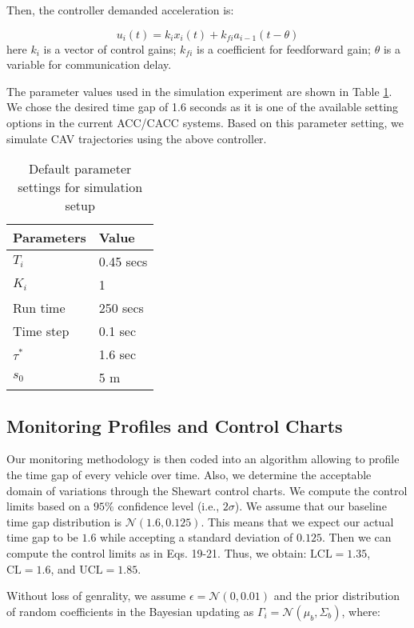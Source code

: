 \documentclass{article}
\begin{document}
Then, the controller demanded acceleration is:

\begin{equation}
u_i(t) = k_ix_i(t) + k_{fi}a_{i-1}(t-\theta)
\end{equation}
here $k_i$ is a vector of control gains; $k_{fi}$ is a coefficient for feedforward gain; $\theta$ is a variable for communication delay. 

The parameter values used in the simulation experiment are shown in Table \ref{tab:setup}. We chose the desired time gap of 1.6 seconds as it is one of the available setting options in the current ACC/CACC systems. Based on this parameter setting, we simulate CAV trajectories using the above controller.  

\begin{table}[!ht]
\centering
\caption{Default parameter settings for simulation setup}
    \begin{tabular}{ll}
    \hline
    \textbf{Parameters} & \textbf{Value}\\
    \hline
        $T_i$ & 0.45 secs\\
        $K_i$ & 1 \\ 
        Run time & 250 secs \\
        Time step & 0.1 sec\\
        $\tau^*$ & 1.6 sec \\
        $s_0$ & 5 m\\
    \hline
\end{tabular}
\label{tab:setup}
\end{table}

\subsection{Monitoring Profiles and Control Charts}

Our monitoring methodology is then coded into an algorithm allowing to profile the time gap of every vehicle over time. Also, we determine the acceptable domain of variations through the Shewart control charts. We compute the control limits based on a $95\%$ confidence level (i.e., $2 \sigma $). We assume that our baseline time gap distribution is $\mathcal{N}(1.6, 0.125)$. This means that we expect our actual time gap to be $1.6$ while accepting a standard deviation of $0.125$. Then we can compute the control limits as in Eqs. 19-21. Thus, we obtain: $\mbox{LCL} = 1.35$, $\mbox{CL} = 1.6$, and $\mbox{UCL} = 1.85$.

Without loss of genrality, we assume $\epsilon=\mathcal{N}(0,0.01)$ and the prior distribution of random coefficients in the Bayesian updating as $\Gamma_i = \mathcal{N}(\mu_b, \Sigma_b)$, where:
\end{document}
